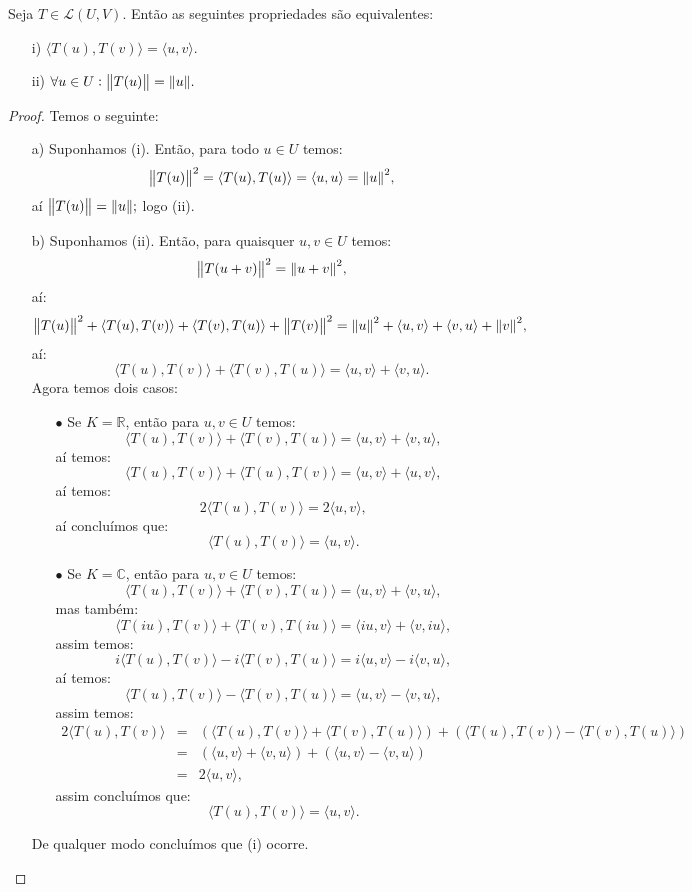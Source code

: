 \documentclass[11pt,twoside,a4paper]{book}
\begin{document}
\begin{teorema}
Seja $T\in\mathcal{L}(U,V)$. Então as seguintes propriedades são equivalentes:
\begin{itemize}
\item[i)] $\langle T(u),T(v)\rangle=
\langle u,v\rangle.$
\item[ii)] $\forall u\in U:\norm{T(u)}=\norm{u}.$
\end{itemize}
\end{teorema}
\begin{proof}
Temos o seguinte:
\begin{itemize}
\item[a)] Suponhamos (i). Então, para todo $u\in U$ temos:
\[
\norm{T(u)}^2=\langle T(u),T(u)\rangle=\langle u,u\rangle=\norm{u}^2,
\]
aí $\norm{T(u)}=\norm{u};$ logo (ii).
\item[b)] Suponhamos (ii). Então, para quaisquer $u,v\in U$ temos:
\[
\norm{T(u+v)}^2=\norm{u+v}^2,
\]
aí:
\[
\norm{T(u)}^2+\langle T(u),T(v)\rangle+\langle T(v),T(u)\rangle+\norm{T(v)}^2=
\norm{u}^2+\langle u,v\rangle+\langle v,u\rangle+\norm{v}^2,
\]
aí:
\[
\langle T(u),T(v)\rangle+\langle T(v),T(u)\rangle=
\langle u,v\rangle+\langle v,u\rangle.
\]
Agora temos dois casos:
\begin{itemize}
\item[$\bullet$] Se $K=\mathbb{R}$, então para $u,v\in U$ temos:
\[
\langle T(u),T(v)\rangle+\langle T(v),T(u)\rangle=
\langle u,v\rangle+\langle v,u\rangle,
\]
aí temos:
\[
\langle T(u),T(v)\rangle+\langle T(u),T(v)\rangle=
\langle u,v\rangle+\langle u,v\rangle,
\]
aí temos:
\[
2\langle T(u),T(v)\rangle=
2\langle u,v\rangle,
\]
aí concluímos que:
\[
\langle T(u),T(v)\rangle=
\langle u,v\rangle.
\]
\item[$\bullet$] Se $K=\mathbb{C}$, então para $u,v\in U$ temos:
\[
\langle T(u),T(v)\rangle+\langle T(v),T(u)\rangle=
\langle u,v\rangle+\langle v,u\rangle,
\]
mas também:
\[
\langle T(iu),T(v)\rangle+\langle T(v),T(iu)\rangle=
\langle iu,v\rangle+\langle v,iu\rangle,
\]
assim temos:
\[
i\langle T(u),T(v)\rangle-i\langle T(v),T(u)\rangle=
i\langle u,v\rangle-i\langle v,u\rangle,
\]
aí temos:
\[
\langle T(u),T(v)\rangle-\langle T(v),T(u)\rangle=
\langle u,v\rangle-\langle v,u\rangle,
\]
assim temos:
\[
\begin{array}{rcl}
2\langle T(u),T(v)\rangle&=&\left(\langle T(u),T(v)\rangle+\langle T(v),T(u)\rangle\right)+\left(\langle T(u),T(v)\rangle-\langle T(v),T(u)\rangle\right)\\
&=&\left(\langle u,v\rangle+\langle v,u\rangle\right)+\left(\langle u,v\rangle-\langle v,u\rangle\right)\\
&=& 2\langle u,v\rangle,
\end{array}
\]
assim concluímos que:
\[
\langle T(u),T(v)\rangle=
\langle u,v\rangle.
\]
\end{itemize}
De qualquer modo concluímos que (i) ocorre.
\end{itemize}
\end{proof}
\end{document}
